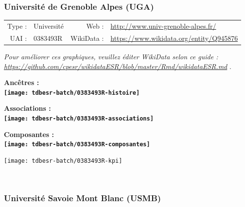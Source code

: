 \documentclass[12pt,french,]{article}
\begin{document}
\hypertarget{universituxe9-de-grenoble-alpes-uga}{%
\subsubsection{Université de Grenoble Alpes
(UGA)}\label{universituxe9-de-grenoble-alpes-uga}}

\begin{tabular*}{\textwidth}{rp{5cm}rl}  
\hline  
Type : & Université & Web : &\href{http://www.univ-grenoble-alpes.fr/}{http://www.univ-grenoble-alpes.fr/} \\  
UAI : & 0383493R & WikiData : & \href{https://www.wikidata.org/entity/Q945876}{https://www.wikidata.org/entity/Q945876} \\  
\hline  
\end{tabular*}

\textit{\scriptsize Pour améliorer ces graphiques, veuillez éditer WikiData selon ce guide :  \href{https://github.com/cpesr/wikidataESR/blob/master/Rmd/wikidataESR.md}{https://github.com/cpesr/wikidataESR/blob/master/Rmd/wikidataESR.md}}
.

\vspace{1cm}  
\begin{minipage}[b]{0.50\textwidth}\begin{center} \bf Ancêtres : \\  
\texttt{[image: tdbesr-batch/0383493R-histoire]} \end{center}\end{minipage}\begin{minipage}[b]{0.50\textwidth}\begin{center} \bf Associations : \\  
\texttt{[image: tdbesr-batch/0383493R-associations]} \end{center}\end{minipage}

\hrulefill

\begin{center} \bf Composantes : \\  
\texttt{[image: tdbesr-batch/0383493R-composantes]} \end{center}

\begin{center}\texttt{[image: tdbesr-batch/0383493R-kpi]} \end{center}\checkoddpage

\ifoddpage \fi ~\newpage  

\hypertarget{universituxe9-savoie-mont-blanc-usmb}{%
\subsubsection{Université Savoie Mont Blanc
(USMB)}\label{universituxe9-savoie-mont-blanc-usmb}}
\end{document}
